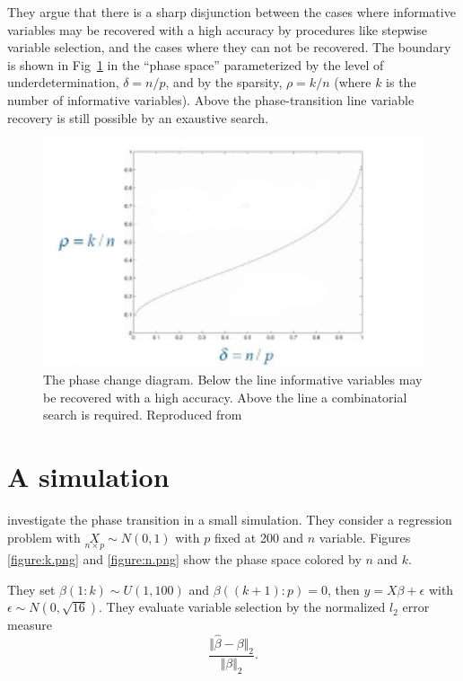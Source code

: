 \documentclass[11pt]{article}
\begin{document}
They argue that there is a sharp disjunction between the cases where informative variables may be recovered with a high
accuracy by procedures like stepwise variable selection, and the cases where they can not be recovered. The boundary is
shown in Fig~\ref{figure:phase-diagram-equivalence.png} in the ``phase space'' parameterized by the level of underdetermination,
$\delta = n/p$, and by the sparsity, $\rho =k/n$ (where $k$ is the number of informative variables).  Above the
phase-transition line variable recovery is still possible by an exaustive search.

\begin{figure}[tbhp] 
    \centering
    \includegraphics[totalheight=6cm,width=12cm]{./figs/phase2.png} %
    \caption{The phase change diagram. Below the line informative variables may be recovered with a high
      accuracy. Above the line a combinatorial search is required. Reproduced from  }
    \label{figure:phase-diagram-equivalence.png} 
    \vspace{4ex}
\end{figure}

\FloatBarrier
\section{A simulation}
\cite{Donoho.and.Stodden.2006} investigate the phase transition in a small simulation.  They consider a regression
problem with $\underset{n\times p}{X}\sim N(0,1)$ with $p$ fixed at 200 and $n$ variable. Figures \ref{figure:k.png} and
\ref{figure:n.png} show the phase space colored by $n$ and $k.$

They set $\beta(1:k) \sim U(1,100)$ and $\beta((k+1):p) =0$, then $y= X\beta + \epsilon$ with
$\epsilon \sim N(0,\sqrt{16})$. They evaluate variable selection by the normalized $l_2$ error measure
$$\frac{\Vert\hat{\beta}-\beta\Vert_2}{\Vert\beta\Vert_2}.$$
\end{document}
